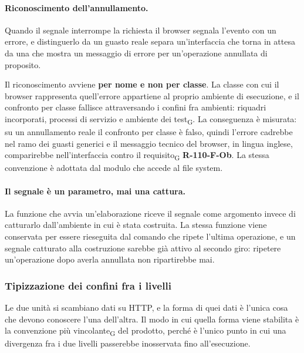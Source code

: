 \documentclass[a4paper, 10pt]{article}
\begin{document}
\paragraph{Riconoscimento dell'annullamento.}
Quando il segnale interrompe la richiesta il browser segnala l'evento con un errore, e distinguerlo da un guasto reale separa un'interfaccia che torna in attesa da una che mostra un messaggio di errore per un'operazione annullata di proposito.

Il riconoscimento avviene \textbf{per nome e non per classe}. La classe con cui il browser rappresenta quell'errore appartiene al proprio ambiente di esecuzione, e il confronto per classe fallisce attraversando i confini fra ambienti: riquadri incorporati, processi di servizio e ambiente dei test\textsubscript{G}. La conseguenza è misurata: su un annullamento reale il confronto per classe è falso, quindi l'errore cadrebbe nel ramo dei guasti generici e il messaggio tecnico del browser, in lingua inglese, comparirebbe nell'interfaccia contro il requisito\textsubscript{G} \textbf{R-110-F-Ob}. La stessa convenzione è adottata dal modulo che accede al file system.

\paragraph{Il segnale è un parametro, mai una cattura.}
La funzione che avvia un'elaborazione riceve il segnale come argomento invece di catturarlo dall'ambiente in cui è stata costruita. La stessa funzione viene conservata per essere rieseguita dal comando che ripete l'ultima operazione, e un segnale catturato alla costruzione sarebbe già attivo al secondo giro: ripetere un'operazione dopo averla annullata non ripartirebbe mai.

\subsubsection{Tipizzazione dei confini fra i livelli}
\label{sec:idiomi-tipizzazione}
Le due unità si scambiano dati su HTTP, e la forma di quei dati è l'unica cosa che devono conoscere l'una dell'altra. Il modo in cui quella forma viene stabilita è la convenzione più vincolante\textsubscript{G} del prodotto, perché è l'unico punto in cui una divergenza fra i due livelli passerebbe inosservata fino all'esecuzione.
\end{document}
